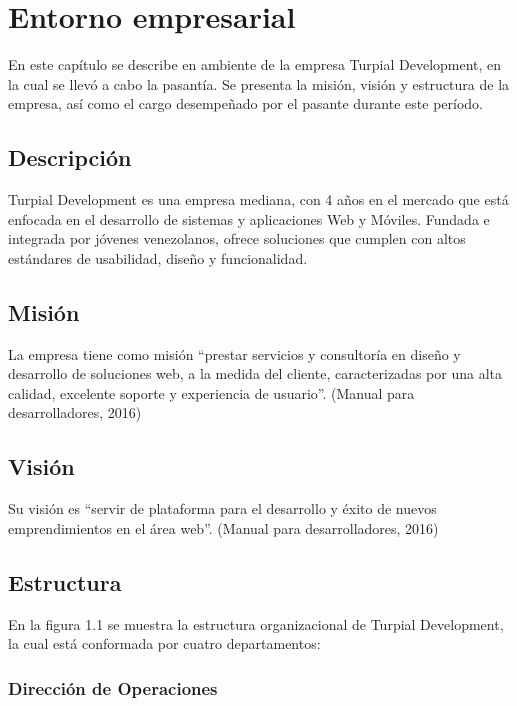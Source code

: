 \chapter{\textbf{Entorno empresarial}}

\thispagestyle{empty}

En este capítulo se describe en ambiente de la empresa Turpial Development, en la cual se llevó a cabo la pasantía. Se presenta la misión, visión y estructura de la empresa, así como el cargo desempeñado por el pasante durante este período.


\section{Descripción}

Turpial Development es una empresa mediana, con 4 años en el mercado que está enfocada en el desarrollo de sistemas y aplicaciones Web y Móviles. Fundada e integrada por jóvenes venezolanos,  ofrece soluciones que cumplen con altos estándares de usabilidad, diseño y funcionalidad.

\section{Misión}

La empresa tiene como misión “prestar servicios y consultoría en diseño y desarrollo de soluciones web, a la medida del cliente, caracterizadas por una alta calidad, excelente soporte y experiencia de usuario”. (Manual para desarrolladores, 2016)


\section{Visión}

Su visión es “servir de plataforma para el desarrollo y éxito de nuevos emprendimientos en el área web”. (Manual para desarrolladores, 2016)

\section{Estructura}

En la figura 1.1 se muestra la estructura organizacional de Turpial Development, la cual está conformada por cuatro departamentos:

\subsection*{Dirección de Operaciones}

